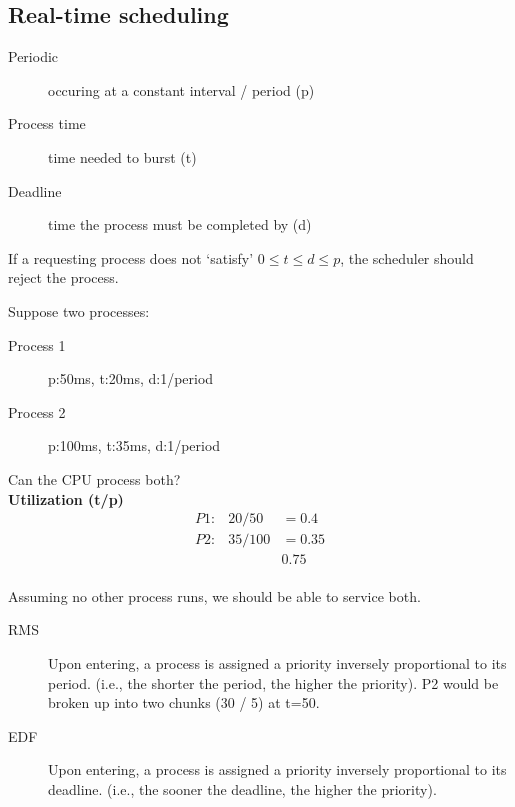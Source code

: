 \documentclass[a4paper]{article}
\begin{document}
\begin{multicols*}{2}
    \subsection*{Real-time scheduling}
    \begin{description}
        \item[Periodic] occuring at a constant interval / period (p)
        \item[Process time] time needed to burst (t)
        \item[Deadline] time the process must be completed by (d)
    \end{description}

    If a requesting process does not `satisfy' \(0 \leq t \leq d \leq p\), the
    scheduler should reject the process.

    \vspace*{-2em}
    \setlength{\columnsep}{-5em}
    \begin{multicols*}{2}
        Suppose two processes:
        \columnbreak
        \begin{description}
            \item[Process 1]  p:50ms, t:20ms, d:1/period
            \item[Process 2]  p:100ms, t:35ms, d:1/period
        \end{description}
    \end{multicols*}
    \vspace*{-3em}
    \setlength{\columnsep}{1em}
    \begin{multicols*}{3}
        Can the CPU process both?
        \columnbreak \\
        \textbf{Utilization (t/p)}
        \begin{align*}
            P1: & 20/50  & = 0.4  \\
            P2: & 35/100 & = 0.35 \\
                &        & 0.75
        \end{align*}
        \columnbreak \\
        Assuming no other process runs, we should be able to service both.
    \end{multicols*}

    \vspace*{-4em}
    \begin{description}
        \item[RMS] Upon entering, a process is assigned a priority inversely
            proportional to its period. (i.e., the shorter the period, the
            higher the priority). P2 would be broken up into two chunks (30 / 5)
            at t=50.
        \item[EDF] Upon entering, a process is assigned a priority inversely
            proportional to its deadline. (i.e., the sooner the deadline, the higher
            the priority).
    \end{description}


\end{multicols*}
\end{document}
